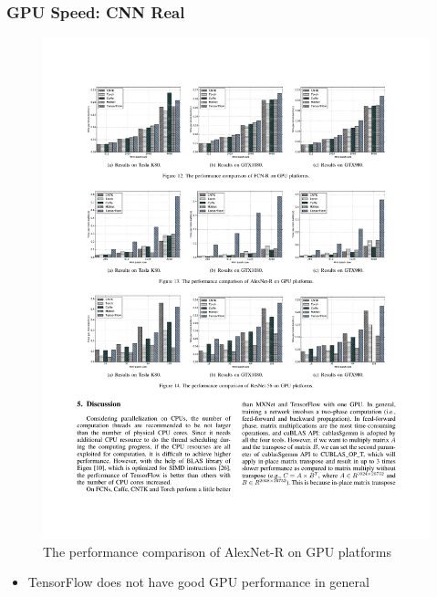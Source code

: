 \begin{frame}
	\MyLogo
	\frametitle{GPU Speed: CNN Real}

	\begin{figure}[htbp] 
		\includegraphics[width=\linewidth]{figures/AlexNet-R2.pdf} 
		\caption{The performance comparison of AlexNet-R on GPU platforms}
	\end{figure}

\pause

\vskip -10pt
\begin{mdframed}[style=mystyle1]
\begin{itemize}
\item TensorFlow does not have good GPU performance in general
\end{itemize}
\end{mdframed}

\end{frame}


